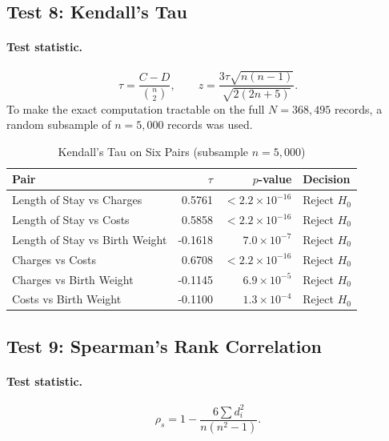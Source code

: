 \documentclass[12pt]{article}
\begin{document}
\subsection{Test 8: Kendall's Tau}

\paragraph{Test statistic.}
\[
  \tau = \frac{C - D}{\binom{n}{2}},
  \qquad z = \frac{3\tau \sqrt{n(n-1)}}{\sqrt{2(2n+5)}}.
\]
To make the exact computation tractable on the full $N=368{,}495$
records, a random subsample of $n=5{,}000$ records was used.

\begin{table}[H]
\centering
\caption{Kendall's Tau on Six Pairs (subsample $n=5{,}000$)}
\label{tab:kendall}
\begin{tabular}{l r r l}
\toprule
\textbf{Pair} & \textbf{$\tau$} & \textbf{$p$-value} & \textbf{Decision} \\
\midrule
Length of Stay vs Charges     &  0.5761 & $< 2.2\times 10^{-16}$ & Reject $H_0$ \\
Length of Stay vs Costs       &  0.5858 & $< 2.2\times 10^{-16}$ & Reject $H_0$ \\
Length of Stay vs Birth Weight     & -0.1618 & $7.0\times 10^{-7}$    & Reject $H_0$ \\
Charges vs Costs   &  0.6708 & $< 2.2\times 10^{-16}$ & Reject $H_0$ \\
Charges vs Birth Weight & -0.1145 & $6.9\times 10^{-5}$    & Reject $H_0$ \\
Costs vs Birth Weight   & -0.1100 & $1.3\times 10^{-4}$    & Reject $H_0$ \\
\bottomrule
\end{tabular}
\end{table}

\subsection{Test 9: Spearman's Rank Correlation}

\paragraph{Test statistic.}
\[
  \rho_s = 1 - \frac{6\sum d_i^2}{n(n^2 - 1)}.
\]
\end{document}
